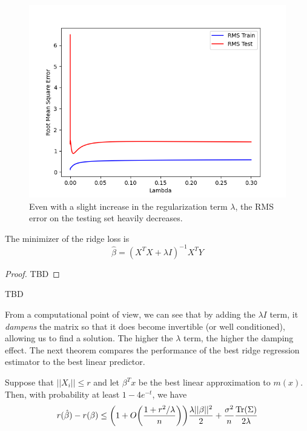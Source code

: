     \begin{figure}[H]
      \centering
      \includegraphics[scale=0.5]{img/Lambda_vs_RMS.png}
      \caption{Even with a slight increase in the regularization term $\lambda$, the RMS error on the testing set heavily decreases. }
      \label{fig:enter-label}
    \end{figure}

    \begin{theorem}
      The minimizer of the ridge loss is 
      \begin{equation}
        \hat{\beta} = (X^T X+ \lambda I)^{-1} X^T Y
      \end{equation}
    \end{theorem}
    \begin{proof}
      TBD
    \end{proof}

    \begin{theorem}
      TBD 
    \end{theorem}

    From a computational point of view, we can see that by adding the $\lambda I$ term, it \textit{dampens} the matrix so that it does become invertible (or well conditioned), allowing us to find a solution. The higher the $\lambda$ term, the higher the damping effect. The next theorem compares the performance of the best ridge regression estimator to the best linear predictor. 

    \begin{theorem} 
      Suppose that $||X_i|| \leq r$ and let $\beta^T x$ be the best linear approximation to $m(x)$. Then, with probability at least $1 - 4 e^{-t}$, we have
      \begin{equation}
        r(\hat{\beta}) - r(\beta) \leq \bigg( 1 + O \bigg( \frac{1 + r^2 / \lambda}{n} \bigg) \bigg) \frac{\lambda ||\beta||^2}{2} + \frac{\sigma^2}{n} \frac{\Tr(\Sigma)}{2 \lambda}
      \end{equation}
    \end{theorem}


